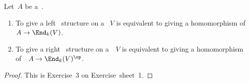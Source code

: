\begin{proposition}
  \label{modules as homomorphisms into endomorphisms}
  Let~$A$ be a~{\kalg}.
  \begin{enumerate}
    \item
      To give a left~{} structure on a~{\module{$\kf$}} $V$ is equivalent to giving a homomorphism of~{\kalgs}~$A \to \End_k(V)$.
    \item
      To give a right~{} structure on a~{\module{$\kf$}}~$V$ is equivalent to giving a homomorphism of~{\kalgs}~$A \to \End_k(V)^\op$.
  \end{enumerate}
\end{proposition}


\begin{proof}
  This is Exercise~3 on Exercise~sheet~1.
\end{proof}




